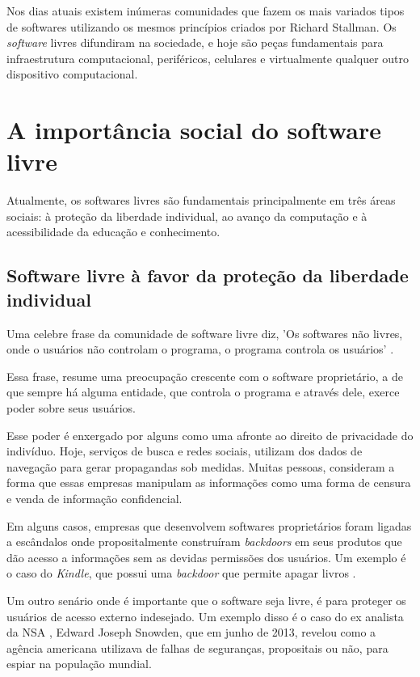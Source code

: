 Nos dias atuais existem inúmeras comunidades que fazem os mais variados tipos de softwares utilizando os mesmos princípios criados por Richard Stallman. Os \textit{software} livres difundiram na sociedade, e hoje são peças fundamentais para infraestrutura computacional, periféricos, celulares e virtualmente qualquer outro dispositivo computacional.

\section{A importância social do software livre}
Atualmente, os softwares livres são fundamentais principalmente em três áreas sociais: à proteção da liberdade individual, ao avanço da computação e à acessibilidade da educação e conhecimento.

\subsection{Software livre à favor da proteção da liberdade individual}
Uma celebre frase da comunidade de software livre diz, 'Os softwares não livres, onde o usuários não controlam o programa, o programa controla os usuários' \cite{Williams}. 

Essa frase, resume uma preocupação crescente com o software proprietário, a de que sempre há   alguma entidade, que controla o programa e através dele, exerce poder sobre seus usuários. 

Esse poder é enxergado por alguns como uma afronte ao direito de privacidade do indivíduo. Hoje, serviços de busca e redes sociais, utilizam dos dados de navegação para gerar propagandas sob medidas.  Muitas pessoas, consideram a forma que essas empresas manipulam as informações como uma forma de censura e venda de informação confidencial. 

Em alguns casos, empresas que desenvolvem softwares proprietários foram ligadas a escândalos onde propositalmente construíram \textit{backdoors} em seus produtos que dão acesso a informações sem as devidas permissões dos usuários. Um exemplo é o caso do \textit{ Kindle}, que possui uma \textit{backdoor} que permite apagar livros \cite{GNUOperatingSystem} .

Um outro senário onde é importante que o software seja livre, é para proteger os usuários de acesso externo indesejado. Um exemplo disso é o caso do ex analista da NSA \cite{Tate2013}, Edward Joseph Snowden, que em junho de 2013, revelou como a agência americana utilizava de falhas de seguranças, propositais ou não, para espiar na população mundial. 

